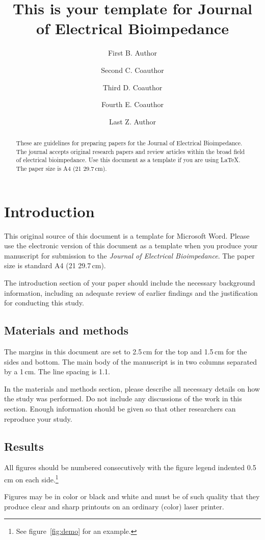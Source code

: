 \documentclass{elbioimp}
\title{This is your template for Journal of Electrical Bioimpedance}
\author{First B. Author\affiliation{Department, University, City, Country}\and
  Second C. Coauthor\sameaffiliation\and
  Third D. Coauthor\affiliation{Xyz company}\and
  Fourth E. Coauthor\sameaffiliation[1]\and
  Last Z. Author\affiliation{E-mail any correspondence to:
    \textsf{myname@domain.com}}}
\begin{document}
\maketitle

\begin{abstract}
  These are guidelines for preparing papers for the Journal of
  Electrical Bioimpedance. The journal accepts original research
  papers and review articles within the broad field of electrical
  bioimpedance. Use this document as a template if you are using
  \LaTeX. The paper size is A4 (21\,\texttimes\,29.7\,cm).
\end{abstract}


\section{Introduction}
This original source of this document is a template for Microsoft Word.
Please use the electronic version of this document as a
template when you produce your manuscript for submission to the
\emph{Journal of Electrical Bioimpedance}. The paper size is standard A4
(21\,\texttimes\,29.7\,cm).  

The introduction section of your paper should include the necessary
background information, including an adequate review of earlier
findings and the justification for conducting this study.


\subsection{Materials and methods}
The margins in this document are set to 2.5\,cm for the top and 1.5\,cm
for the sides and bottom. The main body of the manuscript is in two
columns separated by a 1\,cm. The line spacing is 1.1.

In the materials and methods section, please describe all necessary
details on how the study was performed. Do not include any discussions
of the work in this section. Enough information should be given so
that other researchers can reproduce your study.


\subsection{Results}
All figures should be numbered consecutively with the figure legend
indented 0.5 cm on each side.\footnote{See figure~\ref{fig:demo} for
  an example.} 

Figures may be in color or black and white and must be of such quality
that they produce clear and sharp printouts on an ordinary (color)
laser printer.
\end{document}
